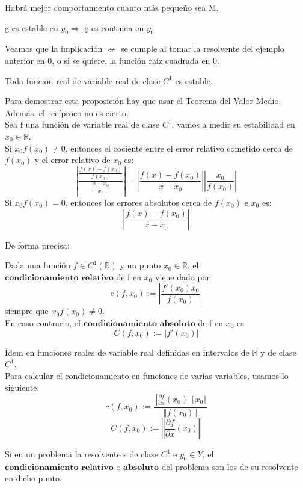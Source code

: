 Habrá mejor comportamiento cuanto más pequeño sea M.

\begin{nprop}
g es estable en $y_0 \Rightarrow$ g es continua en $y_0$
\end{nprop}

Veamos que la implicación $\nLeftarrow$ se cumple al tomar la resolvente del ejemplo anterior en 0, o si se quiere, la función raíz cuadrada en 0.\\

\begin{nprop}
Toda función real de variable real de clase $C^1$ es estable.
\end{nprop}

Para demostrar esta proposición hay que usar el Teorema del Valor Medio. Además, el recíproco no es cierto.\\
Sea f una función de variable real de clase $C^1$, vamos a medir su estabilidad en $x_0 \in \mathbb{R}$.\\
Si $x_0f(x_0) \neq 0$, entonces el cociente entre el error relativo cometido cerca de $f(x_0)$ y el error relativo de $x_0$ es:
\[ \left\vert \frac{\frac{f(x) - f(x_0)}{f(x_0)}}{\frac{x - x_0}{x_0}} \right\vert = \left\vert \frac{f(x) - f(x_0)}{x - x_0} \right\vert \left\vert \frac{x_0}{f(x_0)} \right\vert \]
Si $x_0f(x_0) = 0$, entonces los errores absolutos cerca de $f(x_0)$ e $x_0$ es:
\[ \left\vert \frac{f(x) - f(x_0)}{x - x_0} \right\vert \]

De forma precisa:

\begin{ndef}
Dada una función $f \in C^1(\mathbb{R})$ y un punto $x_0 \in \mathbb{R}$, el $\textbf{condicionamiento relativo}$ de f en $x_0$ viene dado por
\[ c(f, x_0) := \left\vert \frac{f'(x_0)x_0}{f(x_0)} \right\vert \]
siempre que $x_0f(x_0) \neq 0$.\\
En caso contrario, el $\textbf{condicionamiento absoluto}$ de f en $x_0$ es
\[ C(f, x_0) := \vert f'(x_0) \vert \]
\end{ndef}

Ídem en funciones reales de variable real definidas en intervalos de $\mathbb{R}$ y de clase $C^1$.\\
Para calcular el condicionamiento en funciones de varias variables, usamos lo siguiente:
\[ c(f,x_0) := \frac{\left\Vert \frac{\partial f}{\partial x} (x_0) \right\Vert \Vert x_0 \Vert}{\Vert f(x_0) \Vert} \]
\[ C(f,x_0) := \left\Vert \frac{\partial f}{\partial x} (x_0) \right\Vert \]

\begin{ndef}
Si en un problema la resolvente s de clase $C^1$ e $y_0 \in Y$, el $\textbf{condicionamiento relativo}$ o $\textbf{absoluto}$ del problema son los de su resolvente en dicho punto.
\end{ndef}

